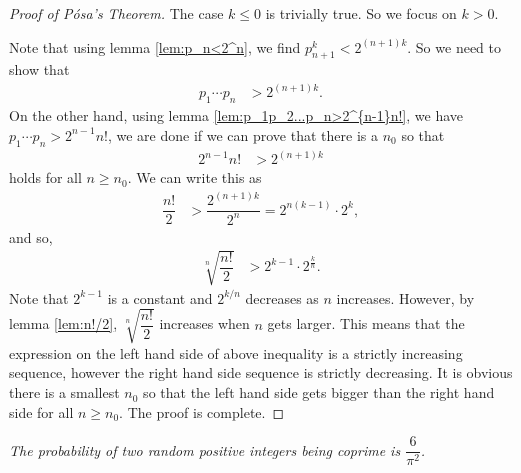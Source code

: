 \documentclass{subfiles}
\begin{document}
	\begin{proof}[Proof of P\'osa's Theorem]
		The case $k\leq0$ is trivially true. So we focus on $k>0$. 
		
		Note that using lemma \eqref{lem:p_n<2^n}, we find $p_{n+1}^k<2^{(n+1)k}$. So we need to show that
		\begin{align*}
			p_1\cdots p_n & > 2^{(n+1)k}.
		\end{align*}
		On the other hand, using lemma \eqref{lem:p_1p_2...p_n>2^{n-1}n!}, we have $p_1\cdots p_n > 2^{n-1}n!$, we are done if we can prove that there is a $n_0$ so that
		\begin{align*}
			2^{n-1}n! & >2^{(n+1)k}
		\end{align*}
		holds for all $n\geq n_0$. We can write this as
		\begin{align*}
			\dfrac{n!}{2} & >\dfrac{2^{(n+1)k}}{2^n} =2^{n(k-1)}\cdot2^k,
		\end{align*}
		and so,
		\begin{align*}
			\sqrt[n]{\dfrac{n!}{2}}&>2^{k-1}\cdot2^{\frac{k}{n}}.
		\end{align*}
		Note that $2^{k-1}$ is a constant and $2^{k/n}$ decreases as $n$ increases. However, by lemma \eqref{lem:n!/2}, $\sqrt[n]{\dfrac{n!}{2}}$ increases when $n$ gets larger. This means that the expression on the left hand side of above inequality is a strictly increasing sequence, however the right hand side sequence is strictly decreasing. It is obvious there is a smallest $n_0$ so that the left hand side gets bigger than the right hand side for all $n\geq n_0$. The proof is complete.
	\end{proof}
	
	\begin{theorem}\slshape
		The probability of two random positive integers being coprime is $\dfrac{6}{\pi^2}$.
	\end{theorem}
	
\end{document}
